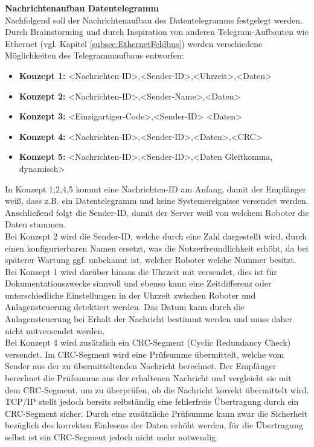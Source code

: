 \documentclass[ a4paper,
                oneside,
                toc=bibliography,
                toc=listof
                ]{scrbook}
\begin{document}
	\textbf{Nachrichtenaufbau Datentelegramm}\\
	Nachfolgend soll der Nachrichtenaufbau des Datentelegramms festgelegt werden. Durch Brainstorming und durch Inspiration von anderen Telegram-Aufbauten wie Ethernet (vgl. Kapitel \ref{subsec:EthernetFeldbus}) werden verschiedene Möglichkeiten des Telegrammaufbaus entworfen:\\
	\begin{itemize}
		\item \textbf{Konzept 1:} <Nachrichten-ID>,<Sender-ID>,<Uhrzeit>,<Daten>
		\item \textbf{Konzept 2:} <Nachrichten-ID>,<Sender-Name>,<Daten>
		\item \textbf{Konzept 3:} <Einzigartiger-Code>,<Sender-ID>
		<Daten>
		\item \textbf{Konzept 4:} <Nachrichten-ID>,<Sender-ID>,<Daten>,<CRC>
		\item \textbf{Konzept 5:} <Nachrichten-ID>,<Sender-ID>,<Daten Gleitkomma, dynamisch>
	\end{itemize}
	In Konzept 1,2,4,5 kommt eine Nachrichten-ID am Anfang, damit der Empfänger weiß, dass z.B. ein Datentelegramm und keine Systemereignisse versendet werden. Anschließend folgt die Sender-ID, damit der Server weiß von welchem Roboter die Daten stammen.\\
	Bei Konzept 2 wird die Sender-ID, welche durch eine Zahl dargestellt wird, durch einen konfigurierbaren Namen ersetzt, was die Nutzerfreundlichkeit erhöht, da bei späterer Wartung ggf. unbekannt ist, welcher Roboter welche Nummer besitzt. \\
	Bei Konzept 1 wird darüber hinaus die Uhrzeit mit versendet, dies ist für Dokumentationszwecke sinnvoll und ebenso kann eine Zeitdifferenz oder unterschiedliche Einstellungen in der Uhrzeit zwischen Roboter und Anlagensteuerung detektiert werden. Das Datum kann durch die Anlagensteuerung bei Erhalt der Nachricht bestimmt werden und muss daher nicht mitversendet werden. \\
	Bei Konzept 4 wird zusätzlich ein CRC-Segment (Cyclic Redundancy Check)  versendet. Im CRC-Segment wird eine Prüfsumme übermittelt, welche vom Sender aus der zu übermitteltenden Nachricht berechnet. Der Empfänger berechnet die Prüfsumme aus der erhaltenen Nachricht und vergleicht sie mit dem CRC-Segment, um zu überprüfen, ob die Nachricht korrekt übermittelt wird. TCP/IP stellt jedoch bereits selbständig eine fehlerfreie Übertragung durch ein CRC-Segment sicher. Durch eine zusätzliche Prüfsumme kann zwar die Sicherheit bezüglich des korrekten Einlesens der Daten erhöht werden, für die Übertragung selbst ist ein CRC-Segment jedoch nicht mehr notwendig. \\
\end{document}
